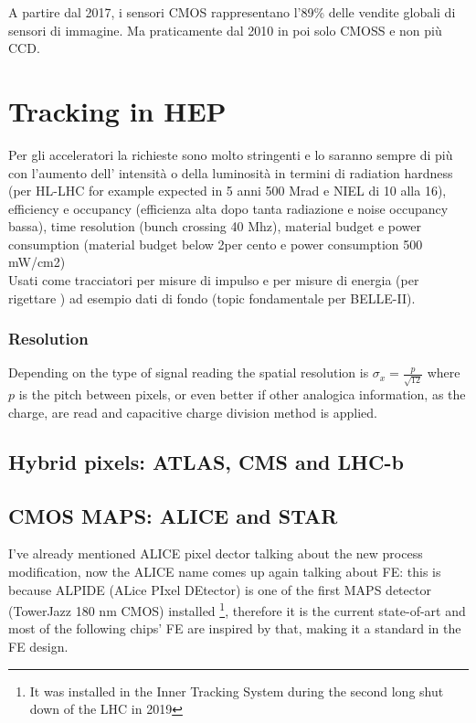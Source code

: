A partire dal 2017, i sensori CMOS rappresentano l'89\% delle vendite globali di sensori di immagine. Ma praticamente dal 2010 in poi solo CMOSS e non più CCD.\\

\section{Tracking in HEP}
    Per gli acceleratori la richieste sono molto stringenti e lo saranno sempre di più con l'aumento dell' intensità o della luminosità in termini di radiation hardness (per HL-LHC for example expected in 5 anni 500 Mrad e NIEL di 10 alla 16), efficiency e occupancy (efficienza alta dopo tanta radiazione e noise occupancy bassa), time resolution (bunch crossing 40 Mhz), material budget e power consumption (material budget below 2per cento e power consumption 500 mW/cm2)\\
    Usati come tracciatori per misure di impulso e per misure di energia (per rigettare ) ad esempio dati di fondo (topic fondamentale per BELLE-II).

    \subsubsection{Resolution}
        Depending on the type of signal reading the spatial resolution is  $\sigma_x = \frac{p}{\sqrt{12}}$ where $p$ is the pitch between pixels, or even better if other 
        analogica information, as the charge, are read and capacitive charge division method is applied.

    \subsection{Hybrid pixels: ATLAS, CMS and LHC-b}
    \subsection{CMOS MAPS: ALICE and STAR}
    I've already mentioned ALICE pixel dector talking about the new process modification, now the ALICE name comes up again talking about FE: this is because ALPIDE (ALice PIxel DEtector) is one of the first MAPS detector (TowerJazz 180 nm CMOS) installed \footnote{It was installed in the Inner Tracking System during the second long shut down of the LHC in 2019}, therefore it is the current state-of-art and most of the following chips' FE are inspired by that, making it a standard in the FE design.
    
